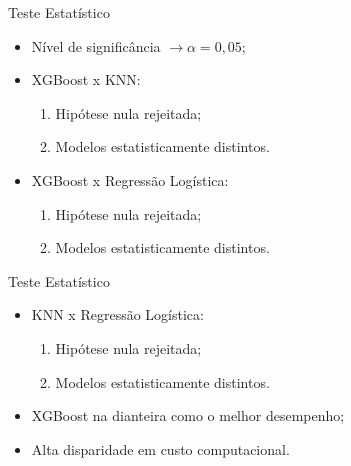 \documentclass{beamer}
\begin{document}
\begin{frame}{Teste Estatístico}

    \begin{itemize}
        \setlength{\itemsep}{10pt}
        \item Nível de significância \(\rightarrow \alpha = 0,05\);
        \item XGBoost x KNN:
        \begin{enumerate}
            \vspace{0.2cm}
            \setlength{\itemsep}{10pt}
            \item Hipótese nula rejeitada;
            \item Modelos estatisticamente distintos.
        \end{enumerate}
        \item XGBoost x Regressão Logística:
        \begin{enumerate}
            \vspace{0.2cm}
            \setlength{\itemsep}{10pt}
            \item Hipótese nula rejeitada;
            \item Modelos estatisticamente distintos.
        \end{enumerate}
    \end{itemize}
    
\end{frame}

\begin{frame}{Teste Estatístico}

    \begin{itemize}
        \setlength{\itemsep}{10pt}
        \item KNN x Regressão Logística:
        \begin{enumerate}
            \vspace{0.2cm}
            \setlength{\itemsep}{10pt}
            \item Hipótese nula rejeitada;
            \item Modelos estatisticamente distintos.
        \end{enumerate}
        \item XGBoost na dianteira como o melhor desempenho;
        \item Alta disparidade em custo computacional.
    \end{itemize}
    
\end{frame}
\end{document}
